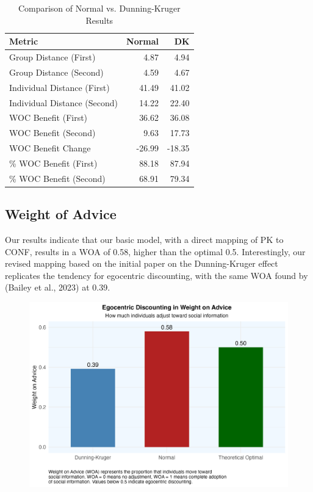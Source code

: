 \documentclass[
  man,floatsintext]{apa6}
\begin{document}
\begin{table}

\caption{\label{tab:comparison-table}Comparison of Normal vs. Dunning-Kruger Results}
\centering
\begin{tabular}[t]{lrr}
\toprule
Metric & Normal & DK\\
\midrule
Group Distance (First) & 4.87 & 4.94\\
Group Distance (Second) & 4.59 & 4.67\\
Individual Distance (First) & 41.49 & 41.02\\
Individual Distance (Second) & 14.22 & 22.40\\
WOC Benefit (First) & 36.62 & 36.08\\
\addlinespace
WOC Benefit (Second) & 9.63 & 17.73\\
WOC Benefit Change & -26.99 & -18.35\\
\% WOC Benefit (First) & 88.18 & 87.94\\
\% WOC Benefit (Second) & 68.91 & 79.34\\
\bottomrule
\end{tabular}
\end{table}

\hypertarget{weight-of-advice-1}{%
\subsection{Weight of Advice}\label{weight-of-advice-1}}

Our results indicate that our basic model, with a direct mapping of PK to CONF, results in a WOA of 0.58, higher than the optimal 0.5. Interestingly, our revised mapping based on the initial paper on the Dunning-Kruger effect replicates the tendency for egocentric discounting, with the same WOA found by (Bailey et al., 2023) at 0.39.

\begin{figure}[H]
\includegraphics[width=7in]{photos/weight_on_advice} \caption{ }\label{fig:unnamed-chunk-5}
\end{figure}
\end{document}
